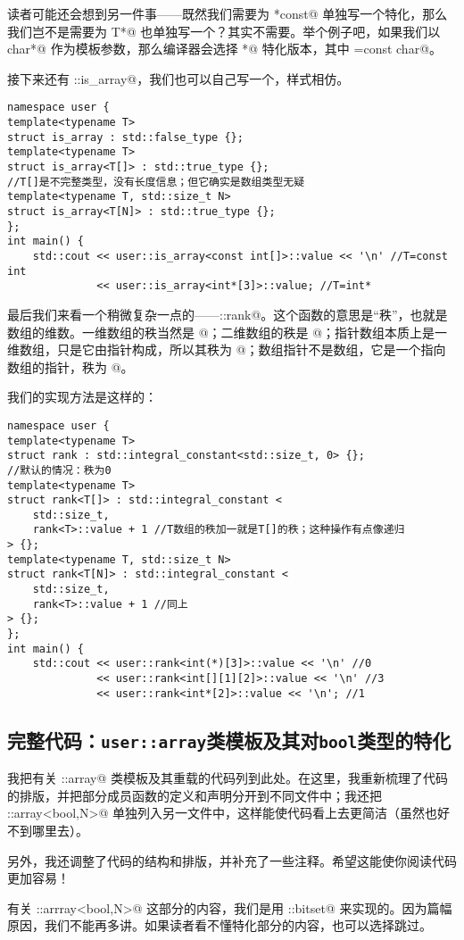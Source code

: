 读者可能还会想到另一件事——既然我们需要为 \lstinline@T*const@ 单独写一个特化，那么我们岂不是需要为 \lstinline@const T*@ 也单独写一个？其实不需要。举个例子吧，如果我们以 \lstinline@const char*@ 作为模板参数，那么编译器会选择 \lstinline@T*@ 特化版本，其中 \lstinline@T=const char@。\par
接下来还有 \lstinline@std::is_array@，我们也可以自己写一个，样式相仿。
\begin{lstlisting}
namespace user {
template<typename T>
struct is_array : std::false_type {};
template<typename T>
struct is_array<T[]> : std::true_type {};
//T[]是不完整类型，没有长度信息；但它确实是数组类型无疑
template<typename T, std::size_t N>
struct is_array<T[N]> : std::true_type {};
};
int main() {
    std::cout << user::is_array<const int[]>::value << '\n' //T=const int
              << user::is_array<int*[3]>::value; //T=int*
\end{lstlisting}\par
最后我们来看一个稍微复杂一点的——\lstinline@std::rank@。这个函数的意思是``秩''，也就是数组的维数。一维数组的秩当然是 @；二维数组的秩是 @；指针数组本质上是一维数组，只是它由指针构成，所以其秩为 @；数组指针不是数组，它是一个指向数组的指针，秩为 @。\par
我们的实现方法是这样的：
\begin{lstlisting}
namespace user {
template<typename T>
struct rank : std::integral_constant<std::size_t, 0> {};
//默认的情况：秩为0
template<typename T>
struct rank<T[]> : std::integral_constant <
    std::size_t,
    rank<T>::value + 1 //T数组的秩加一就是T[]的秩；这种操作有点像递归
> {};
template<typename T, std::size_t N>
struct rank<T[N]> : std::integral_constant <
    std::size_t,
    rank<T>::value + 1 //同上
> {};
};
int main() {
    std::cout << user::rank<int(*)[3]>::value << '\n' //0
              << user::rank<int[][1][2]>::value << '\n' //3
              << user::rank<int*[2]>::value << '\n'; //1
\end{lstlisting}\par
\subsection*{完整代码：\texttt{user::array}类模板及其对\texttt{bool}类型的特化}
我把有关 \lstinline@user::array@ 类模板及其重载的代码列到此处。在这里，我重新梳理了代码的排版，并把部分成员函数的定义和声明分开到不同文件中；我还把 \lstinline@user::array<bool,N>@ 单独列入另一文件中，这样能使代码看上去更简洁（虽然也好不到哪里去）。\par
另外，我还调整了代码的结构和排版，并补充了一些注释。希望这能使你阅读代码更加容易！\par
有关 \lstinline@user::arrray<bool,N>@ 这部分的内容，我们是用 \lstinline@std::bitset@ 来实现的。因为篇幅原因，我们不能再多讲。如果读者看不懂特化部分的内容，也可以选择跳过。\par



